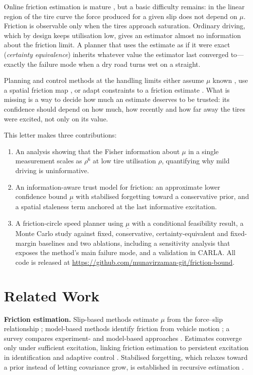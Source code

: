 \documentclass[letterpaper,journal,twoside]{IEEEtran}%
\newcommand{\mulb}{\underline{\mu}}
\begin{document}
Online friction estimation is mature \cite{gustafsson1997,hahn2002,khaleghian2017}, but a basic difficulty remains: in the linear region of the tire curve the force produced for a given slip does not depend on $\mu$. Friction is observable only when the tires approach saturation. Ordinary driving, which by design keeps utilisation low, gives an estimator almost no information about the friction limit. A planner that uses the estimate as if it were exact (\emph{certainty equivalence}) inherits whatever value the estimator last converged to---exactly the failure mode when a dry road turns wet on a straight.

Planning and control methods at the handling limits either assume $\mu$ known \cite{brown2017,funke2017}, use a spatial friction map \cite{christ2021}, or adapt constraints to a friction estimate \cite{svensson2022,iarc2026}. What is missing is a way to decide how much an estimate deserves to be trusted: its confidence should depend on how much, how recently and how far away the tires were excited, not only on its value.

This letter makes three contributions:
\begin{enumerate}
\item An analysis showing that the Fisher information about $\mu$ in a single measurement scales as $\rho^6$ at low tire utilisation $\rho$, quantifying why mild driving is uninformative.
\item An information-aware trust model for friction: an approximate lower confidence bound $\mulb$ with stabilised forgetting toward a conservative prior, and a spatial staleness term anchored at the last informative excitation.
\item A friction-circle speed planner using $\mulb$ with a conditional feasibility result, a Monte Carlo study against fixed, conservative, certainty-equivalent and fixed-margin baselines and two ablations, including a sensitivity analysis that exposes the method's main failure mode, and a validation in CARLA. All code is released at \url{https://github.com/munavirzaman-git/friction-bound}.
\end{enumerate}

\section{Related Work}
\textbf{Friction estimation.} Slip-based methods estimate $\mu$ from the force--slip relationship \cite{gustafsson1997}; model-based methods identify friction from vehicle motion \cite{hahn2002}; a survey compares experiment- and model-based approaches \cite{khaleghian2017}. Estimates converge only under sufficient excitation, linking friction estimation to persistent excitation in identification \cite{ljung1999} and adaptive control \cite{astrom1995,narendra1989}. Stabilised forgetting, which relaxes toward a prior instead of letting covariance grow, is established in recursive estimation \cite{kulhavy1993}.
\end{document}

